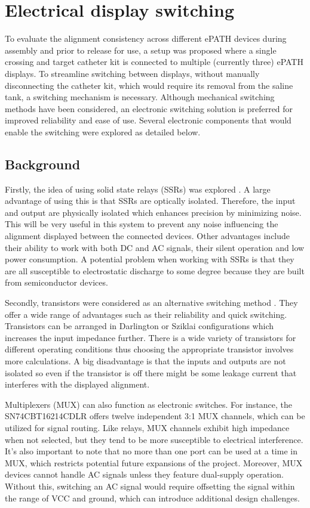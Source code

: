 \section{Electrical display switching}
To evaluate the alignment consistency across different ePATH devices during assembly and prior to release for use, a setup was proposed where a single crossing and target catheter kit is connected to multiple (currently three) ePATH displays. To streamline switching between displays, without manually disconnecting the catheter kit, which would require its removal from the saline tank, a switching mechanism is necessary. Although mechanical switching methods have been considered, an electronic switching solution is preferred for improved reliability and ease of use. Several electronic components that would enable the switching were explored as detailed below.

\subsection{Background}
Firstly, the idea of using solid state relays (SSRs) was explored \cite{ssr_rfwireless}. A large advantage of using this is that SSRs are optically isolated. Therefore, the input and output are physically isolated which enhances precision by minimizing noise. This will be very useful in this system to prevent any noise influencing the alignment displayed between the connected devices. Other advantages include their ability to work with both DC and AC signals, their silent operation and low power consumption. A potential problem when working with SSRs is that they are all susceptible to electrostatic discharge to some degree because they are built from semiconductor devices. 

Secondly, transistors were considered as an alternative switching method \cite{transistor_switch}. They offer a wide range of advantages such as their reliability and quick switching. Transistors can be arranged in Darlington or Sziklai configurations which increases the input impedance further. There is a wide variety of transistors for different operating conditions thus choosing the appropriate transistor involves more calculations. A big disadvantage is that the inputs and outputs are not isolated so even if the transistor is off there might be some leakage current that interferes with the displayed alignment.

Multiplexers (MUX) can also function as electronic switches. For instance, the SN74CBT16214CDLR \cite{sn74cbt_datasheet} offers twelve independent 3:1 MUX channels, which can be utilized for signal routing. Like relays, MUX channels exhibit high impedance when not selected, but they tend to be more susceptible to electrical interference. It's also important to note that no more than one port can be used at a time in MUX, which restricts potential future expansions of the project. Moreover, MUX devices cannot handle AC signals unless they feature dual-supply operation. Without this, switching an AC signal would require offsetting the signal within the range of VCC and ground, which can introduce additional design challenges.

